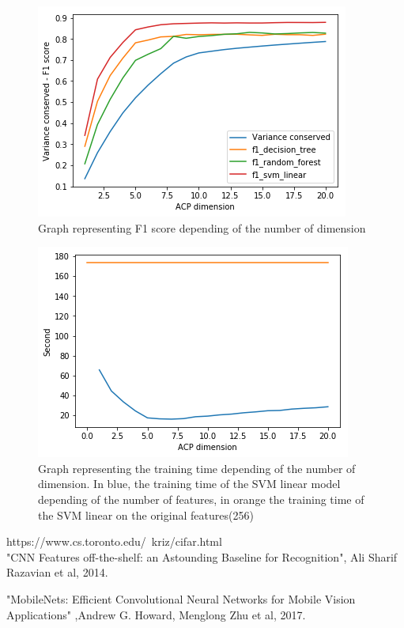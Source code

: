 \documentclass[10pt, a4paper, twocolumn]{article} %
\begin{document}
\begin{figure}[H]
	\center
	\includegraphics[scale=0.4]{graph_1.png} %
	\caption{\label{fig:graph_1}Graph representing F1 score depending of the number of dimension} %
\end{figure}
\pagebreak
\begin{figure}[H]
\center
	\includegraphics[scale=0.4]{graph_2.png} %
	\caption{\label{fig:graph_2}Graph representing the training time depending of the number of dimension. In blue, the training time of the SVM linear model depending of the number of features, in orange the training time of the SVM linear on the original features(256)} %
\end{figure}


\begin{thebibliography}{abcde}

	 https://www.cs.toronto.edu/~kriz/cifar.html\\
     "CNN Features off-the-shelf: an Astounding Baseline for Recognition", Ali Sharif Razavian et al, 2014.
 
     "MobileNets: Efficient Convolutional Neural Networks for Mobile Vision Applications" ,Andrew G. Howard, Menglong Zhu et al, 2017.
\end{thebibliography}

\end{document}

